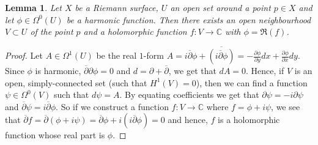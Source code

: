 \documentclass[11pt]{report}
\newtheorem{lemma}[thm]{Lemma}
\theoremstyle{definition}
\newtheorem{example}[thm]{Example}
\begin{document}
\begin{lemma}\label{HarmRealHol}
  Let $X$ be a Riemann surface, $U$ an open set around a point $p \in X$ and let $\phi \in \Omega^0(U)$ be a harmonic function. Then there exists an open neighbourhood $V \subset U$ of the point $p$ and a holomorphic function $f \colon V \rightarrow \mathbb{C}$ with $\phi = \Re(f)$.
\end{lemma}
\begin{proof}
  Let $A \in \Omega^1(U)$ be the real $1$-form $A = i\overline{\partial}\phi + \overline{(i\overline{\partial}\phi)} = -\frac{\partial \phi}{\partial y} dx + \frac{\partial \phi}{\partial x} dy$. Since $\phi$ is harmonic, $\overline{\partial}\partial \phi = 0$ and $d = \partial + \overline{\partial}$, we get that $dA = 0$. Hence, if $V$ is an open, simply-connected set (such that $H^1(V)=0$), then we can find a function $\psi \in \Omega^0(V)$ such that $d\psi = A$. By equating coefficients we get that $\partial \psi = -i \partial \psi$ and $\overline{\partial} \psi = i \overline{\partial} \phi$. So if we construct a function $f \colon V \rightarrow \mathbb{C}$ where $f = \phi + i \psi$, we see that $\overline{\partial}f = \overline{\partial}(\phi + i\psi) = \overline{\partial}\phi +i(i\overline{\partial}\phi) = 0$ and hence, $f$ is a holomorphic function whose real part is $\phi$. 
\end{proof}


\end{document}
